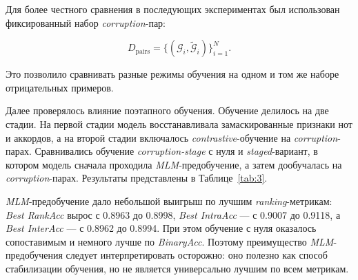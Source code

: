 \documentclass[a4paper,12pt]{extarticle}
\begin{document}
Для более честного сравнения в последующих экспериментах был использован фиксированный набор \textit{corruption}-пар:

\[
D_{\mathrm{pairs}}=\{(\mathcal{G}_i,\widetilde{\mathcal{G}}_i)\}_{i=1}^{N}.
\]

Это позволило сравнивать разные режимы обучения на одном и том же наборе отрицательных примеров. 

Далее проверялось влияние поэтапного обучения. Обучение делилось на две стадии. На первой стадии модель восстанавливала замаскированные признаки нот и аккордов, а на второй стадии включалось \textit{contrastive}-обучение на \textit{corruption}-парах. Сравнивались обучение \textit{corruption-stage} с нуля и \textit{staged}-вариант, в котором модель сначала проходила \textit{MLM}-предобучение, а затем дообучалась на \textit{corruption}-парах. Результаты представлены в Таблице~\ref{tab:3}.

\begin{table}[htbp]
\caption{\textit{Staged training}}
\label{tab:3}
\centering
\scriptsize
{}
\end{table}

\textit{MLM}-предобучение дало небольшой выигрыш по лучшим \textit{ranking}-метрикам: \textit{Best RankAcc} вырос с 0.8963 до 0.8998, \textit{Best IntraAcc} --- с 0.9007 до 0.9118, а \textit{Best InterAcc} --- с 0.8962 до 0.8994. При этом обучение с нуля оказалось сопоставимым и немного лучше по \textit{BinaryAcc}. Поэтому преимущество \textit{MLM}-предобучения следует интерпретировать осторожно: оно полезно как способ стабилизации обучения, но не является универсально лучшим по всем метрикам.
\end{document}

